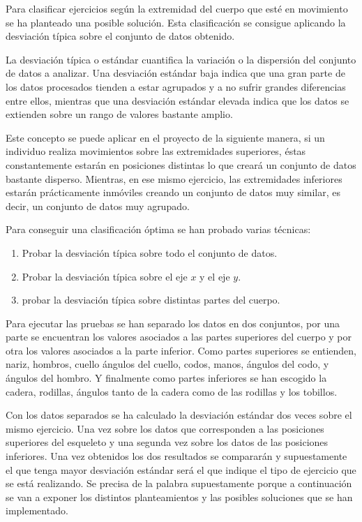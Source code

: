 Para clasificar ejercicios según la extremidad del cuerpo que esté en movimiento se ha planteado una posible solución. Esta clasificación se consigue aplicando la desviación típica sobre el conjunto de datos obtenido. 

La desviación típica o estándar cuantifica la variación o la dispersión del conjunto de datos a analizar. Una desviación estándar baja indica que una gran parte de los datos procesados tienden a estar agrupados y a no sufrir grandes diferencias entre ellos, mientras que una desviación estándar elevada indica que los datos se extienden sobre un rango de valores bastante amplio. 

Este concepto se puede aplicar en el proyecto de la siguiente manera, si un individuo realiza movimientos sobre las extremidades superiores, éstas constantemente estarán en posiciones distintas lo que creará un conjunto de datos bastante disperso. Mientras, en ese mismo ejercicio, las extremidades inferiores estarán prácticamente inmóviles creando un conjunto de datos muy similar, es decir, un conjunto de datos muy agrupado.

Para conseguir una clasificación óptima se han probado varias técnicas:
\begin{enumerate}
    \item Probar la desviación típica sobre todo el conjunto de datos.
    \item Probar la desviación típica sobre el eje $x$ y el eje $y$.
    \item probar la desviación típica sobre distintas partes del cuerpo.
\end{enumerate}

Para ejecutar las pruebas se han separado los datos en dos conjuntos, por una parte se encuentran los valores asociados a las partes superiores del cuerpo y por otra los valores asociados a la parte inferior. Como partes superiores se entienden, nariz, hombros, cuello ángulos del cuello, codos, manos, ángulos del codo, y ángulos del hombro. Y finalmente como partes inferiores se han escogido la cadera, rodillas, ángulos tanto de la cadera como de las rodillas y los tobillos.

Con los datos separados se ha calculado la desviación estándar dos veces sobre el mismo ejercicio. Una vez sobre los datos que corresponden a las posiciones superiores del esqueleto y una segunda vez sobre los datos de las posiciones inferiores. Una vez obtenidos los dos resultados se compararán y supuestamente el que tenga mayor desviación estándar será el que indique el tipo de ejercicio que se está realizando. Se precisa de la palabra supuestamente porque a continuación se van a exponer los distintos planteamientos y las posibles soluciones que se han implementado.  

